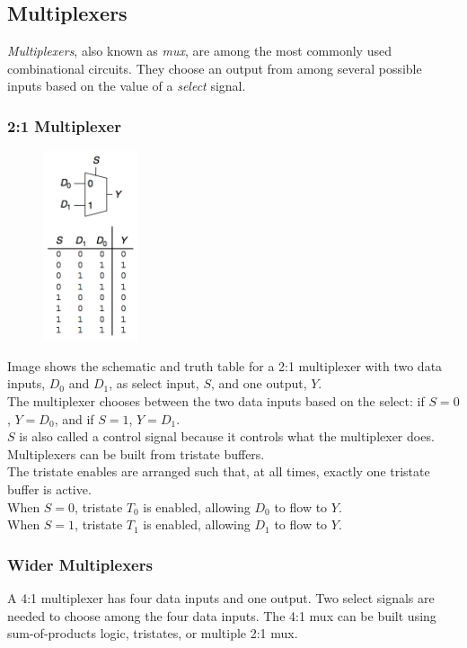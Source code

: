 \documentclass[12pt]{article}
\theoremstyle{definition}
\begin{document}
  \subsection{Multiplexers}
  \emph{Multiplexers}, also known as \emph{mux}, are among the most commonly used combinational circuits.
  They choose an output from among several possible inputs based on the value of a \emph{select} signal.

  \subsubsection{2:1 Multiplexer}
  \begin{figure}
    \centering
    \includegraphics[width=0.25\textwidth]{pictures/2_1_mux.png}
  \end{figure}
  Image shows the schematic and truth table for a 2:1 multiplexer with two data inputs, $D_0$ and $D_1$, as select input, $S$, and one output, $Y$. \\
  The multiplexer chooses between the two data inputs based on the select:
  if $S = 0$, $Y = D_0$, and if $S = 1$, $Y = D_1$.  \\
  $S$ is also called a control signal because it controls what the multiplexer does. \\

  Multiplexers can be built from tristate buffers. \\
  The tristate enables are arranged such that, at all times, exactly one tristate buffer is active. \\
  When $S = 0$, tristate $T_0$ is enabled, allowing $D_0$ to flow to $Y$. \\
  When $S = 1$, tristate $T_1$ is enabled, allowing $D_1$ to flow to $Y$.

  \subsubsection{Wider Multiplexers}
  A 4:1 multiplexer has four data inputs and one output.
  Two select signals are needed to choose among the four data inputs.
  The 4:1 mux can be built using sum-of-products logic, tristates, or multiple 2:1 mux. \\
\end{document}

